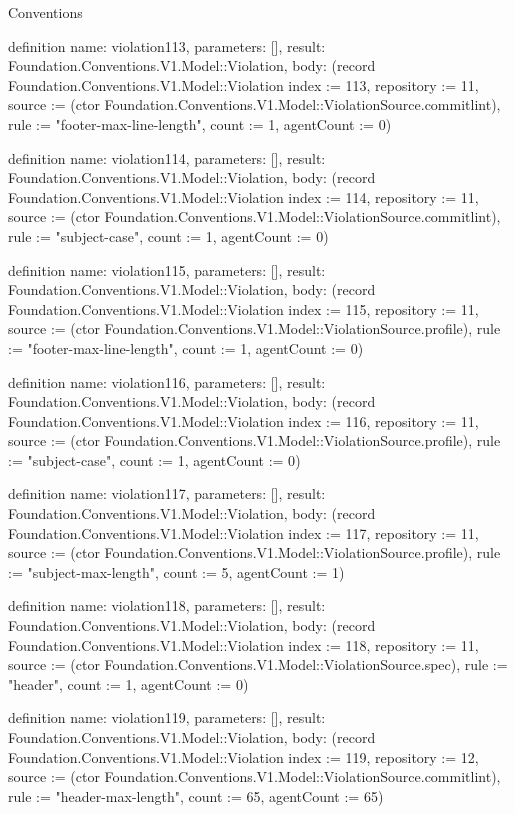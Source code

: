 \begin{lexlean}{Conventions}
\begin{semanticmodule}
definition{
  name: violation113,
  parameters: [],
  result: Foundation.Conventions.V1.Model::Violation,
  body: (record Foundation.Conventions.V1.Model::Violation {index := 113, repository := 11, source := (ctor Foundation.Conventions.V1.Model::ViolationSource.commitlint), rule := "footer-max-line-length", count := 1, agentCount := 0})
}

definition{
  name: violation114,
  parameters: [],
  result: Foundation.Conventions.V1.Model::Violation,
  body: (record Foundation.Conventions.V1.Model::Violation {index := 114, repository := 11, source := (ctor Foundation.Conventions.V1.Model::ViolationSource.commitlint), rule := "subject-case", count := 1, agentCount := 0})
}

definition{
  name: violation115,
  parameters: [],
  result: Foundation.Conventions.V1.Model::Violation,
  body: (record Foundation.Conventions.V1.Model::Violation {index := 115, repository := 11, source := (ctor Foundation.Conventions.V1.Model::ViolationSource.profile), rule := "footer-max-line-length", count := 1, agentCount := 0})
}

definition{
  name: violation116,
  parameters: [],
  result: Foundation.Conventions.V1.Model::Violation,
  body: (record Foundation.Conventions.V1.Model::Violation {index := 116, repository := 11, source := (ctor Foundation.Conventions.V1.Model::ViolationSource.profile), rule := "subject-case", count := 1, agentCount := 0})
}

definition{
  name: violation117,
  parameters: [],
  result: Foundation.Conventions.V1.Model::Violation,
  body: (record Foundation.Conventions.V1.Model::Violation {index := 117, repository := 11, source := (ctor Foundation.Conventions.V1.Model::ViolationSource.profile), rule := "subject-max-length", count := 5, agentCount := 1})
}

definition{
  name: violation118,
  parameters: [],
  result: Foundation.Conventions.V1.Model::Violation,
  body: (record Foundation.Conventions.V1.Model::Violation {index := 118, repository := 11, source := (ctor Foundation.Conventions.V1.Model::ViolationSource.spec), rule := "header", count := 1, agentCount := 0})
}

definition{
  name: violation119,
  parameters: [],
  result: Foundation.Conventions.V1.Model::Violation,
  body: (record Foundation.Conventions.V1.Model::Violation {index := 119, repository := 12, source := (ctor Foundation.Conventions.V1.Model::ViolationSource.commitlint), rule := "header-max-length", count := 65, agentCount := 65})
}


\end{semanticmodule}
\end{lexlean}
